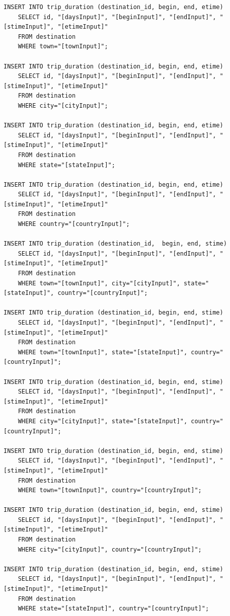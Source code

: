 \documentclass[letterpaper,10pt,onecolumn,compsoc]{IEEEtran}
\begin{document}
\begin{verbatim}
INSERT INTO trip_duration (destination_id, begin, end, etime) 
	SELECT id, "[daysInput]", "[beginInput]", "[endInput]", "[stimeInput]", "[etimeInput]" 
	FROM destination 
	WHERE town="[townInput]";
	
INSERT INTO trip_duration (destination_id, begin, end, etime) 
	SELECT id, "[daysInput]", "[beginInput]", "[endInput]", "[stimeInput]", "[etimeInput]" 
	FROM destination 
	WHERE city="[cityInput]";
	
INSERT INTO trip_duration (destination_id, begin, end, etime) 
	SELECT id, "[daysInput]", "[beginInput]", "[endInput]", "[stimeInput]", "[etimeInput]" 
	FROM destination 
	WHERE state="[stateInput]";
	
INSERT INTO trip_duration (destination_id, begin, end, etime) 
	SELECT id, "[daysInput]", "[beginInput]", "[endInput]", "[stimeInput]", "[etimeInput]" 
	FROM destination 
	WHERE country="[countryInput]";
	
INSERT INTO trip_duration (destination_id,  begin, end, stime) 
	SELECT id, "[daysInput]", "[beginInput]", "[endInput]", "[stimeInput]", "[etimeInput]" 
	FROM destination 
	WHERE town="[townInput]", city="[cityInput]", state="[stateInput]", country="[countryInput]";
	
INSERT INTO trip_duration (destination_id, begin, end, stime) 
	SELECT id, "[daysInput]", "[beginInput]", "[endInput]", "[stimeInput]", "[etimeInput]" 
	FROM destination 
	WHERE town="[townInput]", state="[stateInput]", country="[countryInput]";
	
INSERT INTO trip_duration (destination_id, begin, end, stime) 
	SELECT id, "[daysInput]", "[beginInput]", "[endInput]", "[stimeInput]", "[etimeInput]" 
	FROM destination 
	WHERE city="[cityInput]", state="[stateInput]", country="[countryInput]";
	
INSERT INTO trip_duration (destination_id, begin, end, stime) 
	SELECT id, "[daysInput]", "[beginInput]", "[endInput]", "[stimeInput]", "[etimeInput]" 
	FROM destination 
	WHERE town="[townInput]", country="[countryInput]";
	
INSERT INTO trip_duration (destination_id, begin, end, stime) 
	SELECT id, "[daysInput]", "[beginInput]", "[endInput]", "[stimeInput]", "[etimeInput]" 
	FROM destination 
	WHERE city="[cityInput]", country="[countryInput]";
	
INSERT INTO trip_duration (destination_id, begin, end, stime) 
	SELECT id, "[daysInput]", "[beginInput]", "[endInput]", "[stimeInput]", "[etimeInput]" 
	FROM destination 
	WHERE state="[stateInput]", country="[countryInput]";
	

\end{verbatim}
\end{document}
